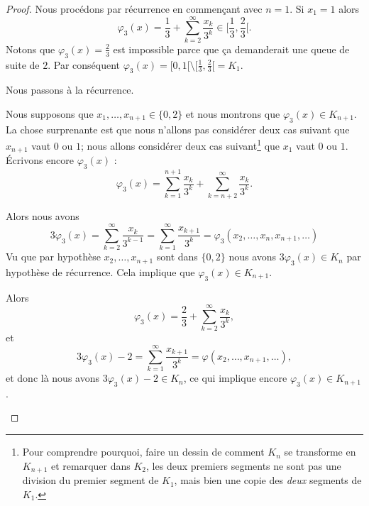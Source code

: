 \begin{proof}
    Nous procédons par récurrence en commençant avec \( n=1\). Si \( x_1=1\) alors
    \begin{equation}
        \varphi_3(x)=\frac{1}{ 3 }+\sum_{k=2}^{\infty}\frac{ x_k }{ 3^k }\in\mathopen[ \frac{1}{ 3 } , \frac{ 2 }{ 3 } [.
    \end{equation}
    Notons que \( \varphi_3(x)=\frac{ 2 }{ 3 }\) est impossible parce que ça demanderait une queue de suite de \( 2\). Par conséquent \( \varphi_3(x)=\mathopen[ 0 , 1 [\setminus\mathopen[ \frac{1}{ 3 } , \frac{ 2 }{ 3 } [=K_1\).

        Nous passons à la récurrence.

        \begin{subproof}
        \item[Sens direct]

        Nous supposons que \( x_1,\ldots, x_{n+1}\in\{ 0,2 \}\) et nous montrons que \( \varphi_3(x)\in K_{n+1}\). La chose surprenante est que nous n'allons pas considérer deux cas suivant que \( x_{n+1}\) vaut \( 0\) ou \( 1\); nous allons considérer deux cas suivant\footnote{Pour comprendre pourquoi, faire un dessin de comment \( K_n\) se transforme en \( K_{n+1}\) et remarquer dans \( K_2\), les deux premiers segments ne sont pas une division du premier segment de \( K_1\), mais bien une copie des \emph{deux} segments de \( K_1\).} que \( x_1\) vaut \( 0\) ou \( 1\). Écrivons encore \( \varphi_3(x)\) :
    \begin{equation}
        \varphi_3(x)=\sum_{k=1}^{n+1}\frac{ x_k }{ 3^k }+\sum_{k=n+2}^{\infty}\frac{ x_k }{ 3^k }.
    \end{equation}
    \begin{subproof}
        \item[Si \( x_1=0\)]
            Alors nous avons
            \begin{equation}
                3\varphi_3(x)=\sum_{k=2}^{\infty}\frac{ x_k }{ 3^{k-1} }=\sum_{k=1}^{\infty}\frac{ x_{k+1} }{ 3^k }=\varphi_3(x_2,\ldots, x_n,x_{n+1},\ldots)
            \end{equation}
            Vu que par hypothèse \( x_2,\ldots, x_{n+1}\) sont dans \( \{ 0,2 \}\) nous avons \( 3\varphi_3(x)\in K_n\) par hypothèse de récurrence. Cela implique que \( \varphi_3(x)\in K_{n+1}\).
        \item[Si \( x_1=2\)]
            Alors
            \begin{equation}
                \varphi_3(x)=\frac{ 2 }{ 3 }+\sum_{k=2}^{\infty}\frac{ x_k }{ 3^k },
            \end{equation}
            et
            \begin{equation}
                3\varphi_3(x)-2=\sum_{k=1}^{\infty}\frac{ x_{k+1} }{ 3^k }=\varphi(x_2,\ldots, x_{n+1},\ldots),
            \end{equation}
            et donc là nous avons \( 3\varphi_3(x)-2\in K_n\), ce qui implique encore \( \varphi_3(x)\in K_{n+1}\).
    \end{subproof}


\end{subproof}
\end{proof}
